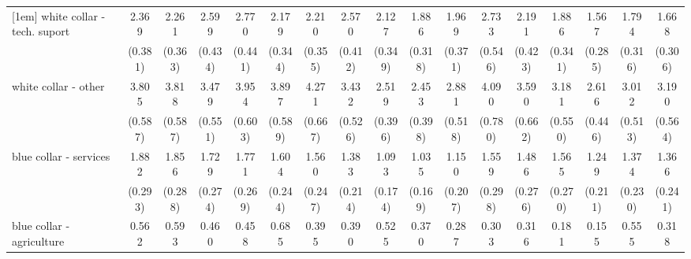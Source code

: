 {\begin{tabular}{l*{16}{c}}
[1em]
white collar - tech. suport&       2.369\sym{***}&       2.261\sym{***}&       2.599\sym{***}&       2.770\sym{***}&       2.179\sym{***}&       2.210\sym{***}&       2.570\sym{***}&       2.127\sym{***}&       1.886\sym{***}&       1.969\sym{***}&       2.733\sym{***}&       2.191\sym{***}&       1.886\sym{***}&       1.567\sym{*}  &       1.794\sym{***}&       1.668\sym{**} \\
                    &     (0.381)         &     (0.363)         &     (0.434)         &     (0.441)         &     (0.344)         &     (0.355)         &     (0.412)         &     (0.349)         &     (0.318)         &     (0.371)         &     (0.546)         &     (0.423)         &     (0.341)         &     (0.285)         &     (0.316)         &     (0.306)         \\
[1em]
white collar - other&       3.805\sym{***}&       3.818\sym{***}&       3.479\sym{***}&       3.954\sym{***}&       3.897\sym{***}&       4.271\sym{***}&       3.432\sym{***}&       2.519\sym{***}&       2.453\sym{***}&       2.881\sym{***}&       4.090\sym{***}&       3.590\sym{***}&       3.181\sym{***}&       2.616\sym{***}&       3.012\sym{***}&       3.190\sym{***}\\
                    &     (0.587)         &     (0.587)         &     (0.551)         &     (0.603)         &     (0.589)         &     (0.667)         &     (0.526)         &     (0.396)         &     (0.398)         &     (0.518)         &     (0.780)         &     (0.662)         &     (0.550)         &     (0.446)         &     (0.513)         &     (0.564)         \\
[1em]
blue collar - services&       1.882\sym{***}&       1.856\sym{***}&       1.729\sym{***}&       1.771\sym{***}&       1.604\sym{**} &       1.560\sym{**} &       1.383\sym{*}  &       1.093         &       1.035         &       1.150         &       1.559\sym{*}  &       1.486\sym{*}  &       1.565\sym{**} &       1.249         &       1.374         &       1.366         \\
                    &     (0.293)         &     (0.288)         &     (0.274)         &     (0.269)         &     (0.244)         &     (0.247)         &     (0.214)         &     (0.174)         &     (0.169)         &     (0.207)         &     (0.298)         &     (0.276)         &     (0.270)         &     (0.211)         &     (0.230)         &     (0.241)         \\
[1em]
blue collar - agriculture&       0.562         &       0.593         &       0.460         &       0.458         &       0.685         &       0.395\sym{*}  &       0.390         &       0.525         &       0.370\sym{*}  &       0.287\sym{**} &       0.303\sym{*}  &       0.316\sym{**} &       0.181\sym{***}&       0.155\sym{***}&       0.555         &       0.318\sym{*}  \\

\end{tabular}}
